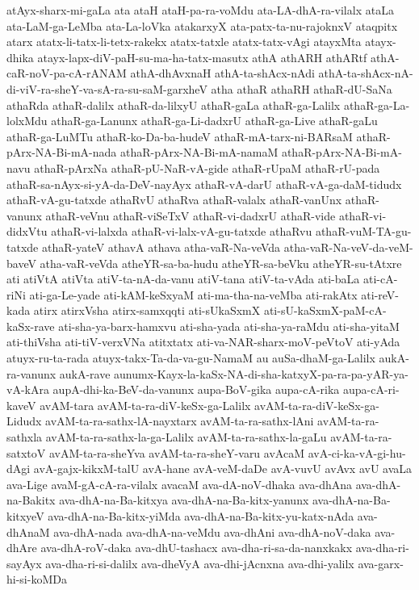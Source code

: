 {atAyx-sharx-mi-gaLa
ata
ataH
ataH-pa-ra-voMdu
ata-LA-dhA-ra-vilalx
ataLa
ata-LaM-ga-LeMba
ata-La-loVka
atakarxyX
ata-patx-ta-nu-rajoknxV
ataqpitx
atarx
atatx-li-tatx-li-tetx-rakekx
atatx-tatxle
atatx-tatx-vAgi
atayxMta
atayx-dhika
atayx-lapx-diV-paH-su-ma-ha-tatx-masutx
athA
athARH
athARtf
athA-caR-noV-pa-cA-rANAM
athA-dhAvxnaH
athA-ta-shAcx-nAdi
athA-ta-shAcx-nA-di-viV-ra-sheY-va-sA-ra-su-saM-garxheV
atha
athaR
athaRH
athaR-dU-SaNa
athaRda
athaR-dalilx
athaR-da-lilxyU
athaR-gaLa
athaR-ga-Lalilx
athaR-ga-La-lolxMdu
athaR-ga-Lanunx
athaR-ga-Li-dadxrU
athaR-ga-Live
athaR-gaLu
athaR-ga-LuMTu
athaR-ko-Da-ba-hudeV
athaR-mA-tarx-ni-BARsaM
athaR-pArx-NA-Bi-mA-nada
athaR-pArx-NA-Bi-mA-namaM
athaR-pArx-NA-Bi-mA-navu
athaR-pArxNa
athaR-pU-NaR-vA-gide
athaR-rUpaM
athaR-rU-pada
athaR-sa-nAyx-si-yA-da-DeV-nayAyx
athaR-vA-darU
athaR-vA-ga-daM-tidudx
athaR-vA-gu-tatxde
athaRvU
athaRva
athaR-valalx
athaR-vanUnx
athaR-vanunx
athaR-veVnu
athaR-viSeTxV
athaR-vi-dadxrU
athaR-vide
athaR-vi-didxVtu
athaR-vi-lalxda
athaR-vi-lalx-vA-gu-tatxde
athaRvu
athaR-vuM-TA-gu-tatxde
athaR-yateV
athavA
athava
atha-vaR-Na-veVda
atha-vaR-Na-veV-da-veM-baveV
atha-vaR-veVda
atheYR-sa-ba-hudu
atheYR-sa-beVku
atheYR-su-tAtxre
ati
atiVtA
atiVta
atiV-ta-nA-da-vanu
atiV-tana
atiV-ta-vAda
ati-baLa
ati-cA-riNi
ati-ga-Le-yade
ati-kAM-keSxyaM
ati-ma-tha-na-veMba
ati-rakAtx
ati-reV-kada
atirx
atirxVsha
atirx-samxqqti
ati-sUkaSxmX
ati-sU-kaSxmX-paM-cA-kaSx-rave
ati-sha-ya-barx-hamxvu
ati-sha-yada
ati-sha-ya-raMdu
ati-sha-yitaM
ati-thiVsha
ati-tiV-verxVNa
atitxtatx
ati-va-NAR-sharx-moV-peVtoV
ati-yAda
atuyx-ru-ta-rada
atuyx-takx-Ta-da-va-gu-NamaM
au
auSa-dhaM-ga-Lalilx
aukA-ra-vanunx
aukA-rave
aunumx-Kayx-la-kaSx-NA-di-sha-katxyX-pa-ra-pa-yAR-ya-vA-kAra
aupA-dhi-ka-BeV-da-vanunx
aupa-BoV-gika
aupa-cA-rika
aupa-cA-ri-kaveV
avAM-tara
avAM-ta-ra-diV-keSx-ga-Lalilx
avAM-ta-ra-diV-keSx-ga-Lidudx
avAM-ta-ra-sathx-lA-nayxtarx
avAM-ta-ra-sathx-lAni
avAM-ta-ra-sathxla
avAM-ta-ra-sathx-la-ga-Lalilx
avAM-ta-ra-sathx-la-gaLu
avAM-ta-ra-satxtoV
avAM-ta-ra-sheYva
avAM-ta-ra-sheY-varu
avAcaM
avA-ci-ka-vA-gi-hu-dAgi
avA-gajx-kikxM-talU
avA-hane
avA-veM-daDe
avA-vuvU
avAvx
avU
avaLa
ava-Lige
avaM-gA-cA-ra-vilalx
avacaM
ava-dA-noV-dhaka
ava-dhAna
ava-dhA-na-Bakitx
ava-dhA-na-Ba-kitxya
ava-dhA-na-Ba-kitx-yanunx
ava-dhA-na-Ba-kitxyeV
ava-dhA-na-Ba-kitx-yiMda
ava-dhA-na-Ba-kitx-yu-katx-nAda
ava-dhAnaM
ava-dhA-nada
ava-dhA-na-veMdu
ava-dhAni
ava-dhA-noV-daka
ava-dhAre
ava-dhA-roV-daka
ava-dhU-tashacx
ava-dha-ri-sa-da-nanxkakx
ava-dha-ri-sayAyx
ava-dha-ri-si-dalilx
ava-dheVyA
ava-dhi-jAcnxna
ava-dhi-yalilx
ava-garx-hi-si-koMDa
}
